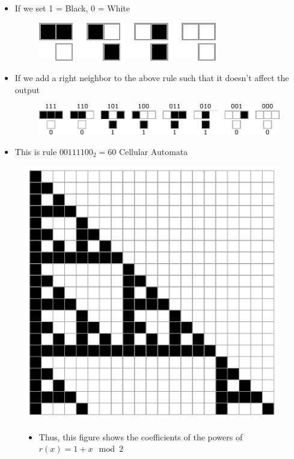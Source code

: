 \documentclass{beamer}
\begin{document}
\begin{frame}
    \begin{itemize}
        \item If we set 1 = Black, 0 = White
        \begin{figure}
            \centering
            \includegraphics{addRule.pdf}
        \end{figure}
        \item If we add a right neighbor to the above rule such that it doesn't affect the output
        \begin{figure}
            \centering
            \includegraphics[scale=0.7]{rule60Num.pdf}
        \end{figure}
        \item This is rule $00111100_2 = 60$ Cellular Automata
    \end{itemize}

\end{frame}

\begin{frame}
    \begin{figure}
        \centering
        \includegraphics[scale=0.4]{sierSmall}
        \begin{itemize}
            \item Thus, this figure shows the coefficients of the powers of $r(x) = 1+x \mod 2$
        \end{itemize}
    \end{figure}
\end{frame}
\end{document}
